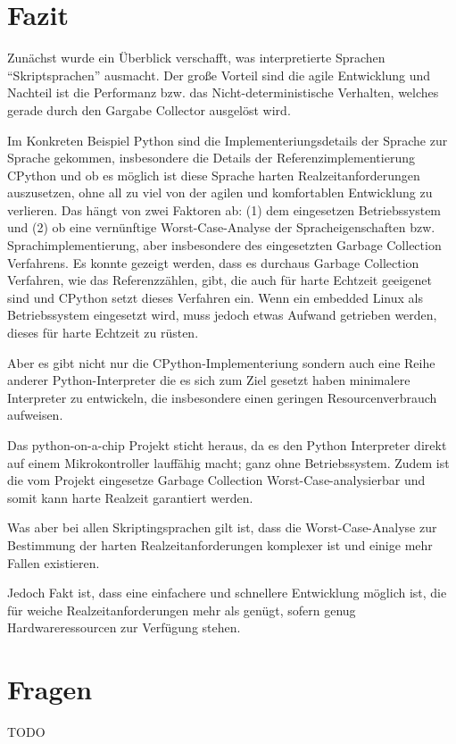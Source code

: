 \section{Fazit}


Zunächst wurde ein Überblick verschafft, was interpretierte Sprachen
“Skriptsprachen” ausmacht. Der große Vorteil sind die agile Entwicklung und
Nachteil ist die Performanz bzw. das Nicht-deterministische Verhalten, welches
gerade durch den Gargabe Collector ausgelöst wird.

Im Konkreten Beispiel Python sind die Implementeriungsdetails der Sprache zur
Sprache gekommen, insbesondere die Details der Referenzimplementierung CPython
und ob es möglich ist diese Sprache harten Realzeitanforderungen auszusetzen,
ohne all zu viel von der agilen und komfortablen Entwicklung zu verlieren.
Das hängt von zwei Faktoren ab: (1) dem eingesetzen Betriebssystem und (2) ob
eine vernünftige Worst-Case-Analyse der Spracheigenschaften bzw.
Sprachimplementierung, aber insbesondere des eingesetzten Garbage Collection
Verfahrens. Es konnte gezeigt werden, dass es durchaus Garbage Collection
Verfahren, wie das Referenzzählen, gibt, die auch für harte Echtzeit geeigenet
sind und CPython setzt dieses Verfahren ein. Wenn ein embedded Linux als
Betriebssystem eingesetzt wird, muss jedoch etwas Aufwand getrieben werden,
dieses für harte Echtzeit zu rüsten.

Aber es gibt nicht nur die CPython-Implementeriung sondern auch eine Reihe
anderer Python-Interpreter die es sich zum Ziel gesetzt haben minimalere
Interpreter zu entwickeln, die insbesondere einen geringen Resourcenverbrauch
aufweisen.

Das python-on-a-chip Projekt sticht heraus, da es den Python Interpreter
direkt auf einem Mikrokontroller lauffähig macht; ganz ohne Betriebssystem.
Zudem ist die vom Projekt eingesetze Garbage Collection
Worst-Case-analysierbar und somit kann harte Realzeit garantiert werden.

Was aber bei allen Skriptingsprachen gilt ist, dass die Worst-Case-Analyse
zur Bestimmung der harten Realzeitanforderungen komplexer ist und einige
mehr Fallen existieren.

Jedoch Fakt ist, dass eine einfachere und schnellere Entwicklung möglich ist,
die für weiche Realzeitanforderungen mehr als genügt, sofern genug
Hardwareressourcen zur Verfügung stehen.


\section{Fragen}

TODO
